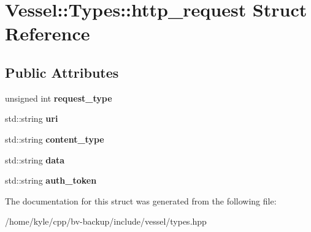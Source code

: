 \hypertarget{struct_vessel_1_1_types_1_1http__request}{}\section{Vessel\+:\+:Types\+:\+:http\+\_\+request Struct Reference}
\label{struct_vessel_1_1_types_1_1http__request}
\subsection*{Public Attributes}
\begin{DoxyCompactItemize}
\item 
\mbox{\label{struct_vessel_1_1_types_1_1http__request_a6621791d5b5e6d76a645c123343cc365}} 
unsigned int {\bfseries request\+\_\+type}
\item 
\mbox{\label{struct_vessel_1_1_types_1_1http__request_a96027bd32b4a38dbc5d03c603b250df6}} 
std\+::string {\bfseries uri}
\item 
\mbox{\label{struct_vessel_1_1_types_1_1http__request_a6c15d192c5cf2345144120b8f4f88444}} 
std\+::string {\bfseries content\+\_\+type}
\item 
\mbox{\label{struct_vessel_1_1_types_1_1http__request_a72f4911e912df0d71f7cc887fc7031ba}} 
std\+::string {\bfseries data}
\item 
\mbox{\label{struct_vessel_1_1_types_1_1http__request_ab49e812c546cf319b23c622f1cb4bb00}} 
std\+::string {\bfseries auth\+\_\+token}
\end{DoxyCompactItemize}


The documentation for this struct was generated from the following file\+:\begin{DoxyCompactItemize}
\item 
/home/kyle/cpp/bv-\/backup/include/vessel/types.\+hpp\end{DoxyCompactItemize}
